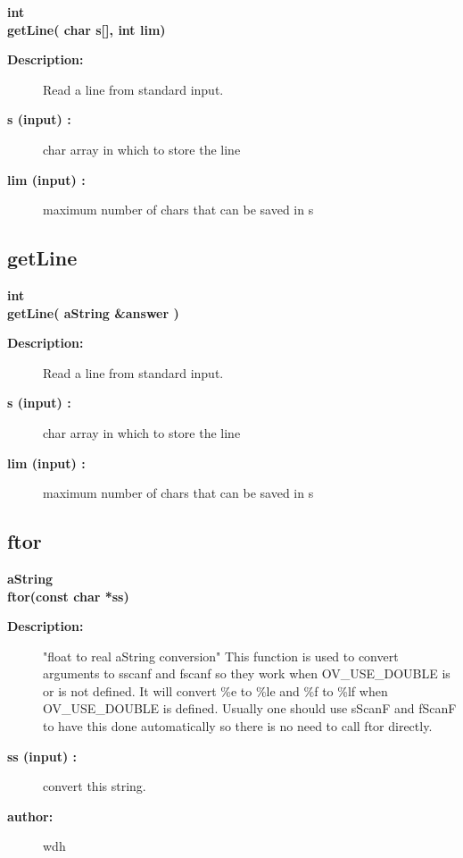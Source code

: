 \begin{flushleft} \textbf{%
int  \\ 
\settowidth{\otherStuffIncludeArgIndent}{getLine(}%
getLine( char s[], int lim)
}\end{flushleft}
\begin{description}
\item[{\bf Description:}] 
  Read a line from standard input. 
\item[{\bf s (input) :}]  char array in which to store the line
\item[{\bf lim (input) :}]  maximum number of chars that can be saved in s
\end{description}
\subsection{getLine}
 
\begin{flushleft} \textbf{%
int \\ 
\settowidth{\otherStuffIncludeArgIndent}{getLine(}%
getLine( aString \&answer )
}\end{flushleft}
\begin{description}
\item[{\bf Description:}] 
  Read a line from standard input.
\item[{\bf s (input) :}]  char array in which to store the line
\item[{\bf lim (input) :}]  maximum number of chars that can be saved in s
\end{description}
\subsection{ftor}
 
\begin{flushleft} \textbf{%
aString \\ 
\settowidth{\otherStuffIncludeArgIndent}{ftor(}%
ftor(const char *ss)
}\end{flushleft}
\begin{description}
\item[{\bf Description:}] 
 "float to real aString conversion" 
 This function is used to convert arguments to sscanf and fscanf so they work
 when OV\_USE\_DOUBLE is or is not defined. It will convert \%e to \%le and \%f to \%lf 
 when OV\_USE\_DOUBLE is defined.
  Usually one should use sScanF and fScanF
   to have this done automatically so
 there is no need to call ftor directly.
\item[{\bf ss (input) :}]  convert this string.
\item[{\bf author:}]  wdh
\end{description}
